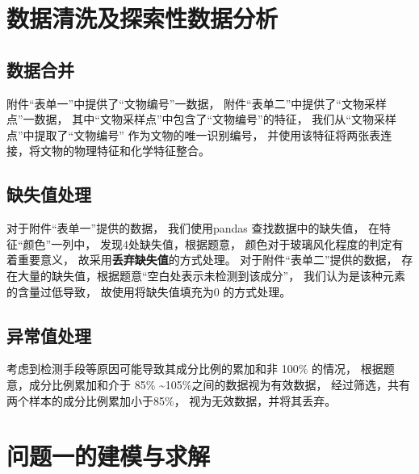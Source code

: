 



\section{数据清洗及探索性数据分析}

\subsection{数据合并}

附件``表单一''中提供了``文物编号''一数据，
附件``表单二''中提供了``文物采样点''一数据，
其中``文物采样点''中包含了``文物编号''的特征，
我们从``文物采样点''中提取了``文物编号'' 作为文物的唯一识别编号，
并使用该特征将两张表连接，将文物的物理特征和化学特征整合。


\subsection{缺失值处理}
对于附件``表单一''提供的数据，
我们使用pandas \cite{reback2020pandas} 查找数据中的缺失值，
在特征``颜色''一列中，
发现4处缺失值，根据题意，
颜色对于玻璃风化程度的判定有着重要意义，
故采用\textbf{丢弃缺失值}的方式处理。
对于附件``表单二''提供的数据，
存在大量的缺失值，根据题意``空白处表示未检测到该成分''，
我们认为是该种元素的含量过低导致，
故使用将缺失值填充为$ 0 $ 的方式处理。


\subsection{异常值处理}
考虑到检测手段等原因可能导致其成分比例的累加和非 100\% 的情况，
根据题意，成分比例累加和介于 85\% \textasciitilde 105\%之间的数据视为有效数据，
经过筛选，共有两个样本的成分比例累加小于85\%，
视为无效数据，并将其丢弃。

\section{问题一的建模与求解}

